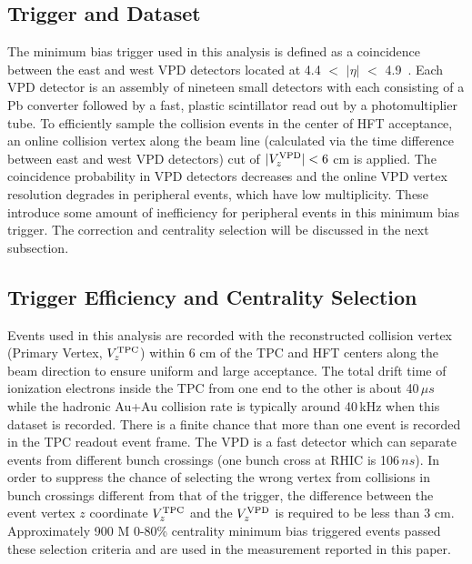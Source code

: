 \documentclass[%
 reprint,	
 amsmath,amssymb,
 aps,
 prc,
]{revtex4-1}
\begin{document}
\subsection{\label{sec:dataset:trigger}Trigger and Dataset}
The minimum bias trigger used in this analysis is defined as a coincidence between the east and west VPD detectors located at 4.4 $<$ $|\eta|$ $<$ 4.9~\cite{VPD}. Each VPD detector is an assembly of nineteen small detectors with each consisting of a Pb converter followed by a fast, plastic scintillator read out by a photomultiplier tube. To efficiently sample the collision events in the center of HFT acceptance, an online collision vertex along the beam line (calculated via the time difference between east and west VPD detectors) cut of $|V_z^{\rm VPD}|<6$ cm is applied. The coincidence probability in VPD detectors decreases and the online VPD vertex resolution degrades in peripheral events, which have low multiplicity. These introduce some amount of inefficiency for peripheral events in this minimum bias trigger. The correction and centrality selection will be discussed in the next subsection.

\subsection{\label{sec:dataset:Centrality}Trigger Efficiency and Centrality Selection}
Events used in this analysis are recorded with
the reconstructed collision vertex (Primary Vertex, $V_{z}^{\rm TPC}$) within 6 cm of the TPC and HFT centers along the beam direction to ensure uniform and large acceptance. The total drift time of ionization electrons inside the TPC from one end to the other is about 40\,$\mu s$ while the hadronic Au+Au collision rate is typically around 40\,kHz when this dataset is recorded. There is a finite chance that more than one event is recorded in the TPC readout event frame. The VPD is a fast detector which can separate events from different bunch crossings (one bunch cross at RHIC is 106\,$ns$). In order to suppress the chance of selecting the wrong vertex from collisions in bunch crossings different from that of the trigger, the difference between the event vertex $z$ coordinate $V_{z}^{\rm TPC}$ and the $V_{z}^{\rm VPD}$ is required to be less than 3 cm. Approximately 900 M 0-80\% centrality minimum bias triggered events passed these selection criteria and are used in the measurement reported in this paper.
\end{document}

